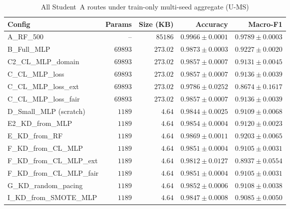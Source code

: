 \documentclass[journal]{IEEEtran}
\newcommand{\ums}{U-MS}
\begin{document}
\begin{table}[!t]
\caption{All Student~A routes under train-only multi-seed aggregate (\ums{})}
\label{tab:all-A}
\centering
\scriptsize
\begin{tabular}{lrrrr}
\toprule
Config & Params & Size (KB) & Accuracy & Macro-F1 \\
\midrule
A\_RF\_500 & -- & $85186$ & $0.9966 \pm 0.0001$ & $0.9789 \pm 0.0003$ \\
B\_Full\_MLP & $69893$ & $273.02$ & $0.9873 \pm 0.0003$ & $0.9227 \pm 0.0020$ \\
C2\_CL\_MLP\_domain & $69893$ & $273.02$ & $0.9857 \pm 0.0007$ & $0.9131 \pm 0.0045$ \\
C\_CL\_MLP\_loss & $69893$ & $273.02$ & $0.9857 \pm 0.0007$ & $0.9136 \pm 0.0039$ \\
C\_CL\_MLP\_loss\_ext & $69893$ & $273.02$ & $0.9786 \pm 0.0252$ & $0.8674 \pm 0.1617$ \\
C\_CL\_MLP\_loss\_fair & $69893$ & $273.02$ & $0.9857 \pm 0.0007$ & $0.9136 \pm 0.0039$ \\
D\_Small\_MLP (scratch) & $1189$ & $4.64$ & $0.9844 \pm 0.0025$ & $0.9109 \pm 0.0068$ \\
E2\_KD\_from\_MLP & $1189$ & $4.64$ & $0.9854 \pm 0.0004$ & $0.9120 \pm 0.0023$ \\
E\_KD\_from\_RF & $1189$ & $4.64$ & $0.9869 \pm 0.0011$ & $0.9203 \pm 0.0065$ \\
F\_KD\_from\_CL\_MLP & $1189$ & $4.64$ & $0.9851 \pm 0.0004$ & $0.9105 \pm 0.0031$ \\
F\_KD\_from\_CL\_MLP\_ext & $1189$ & $4.64$ & $0.9812 \pm 0.0127$ & $0.8937 \pm 0.0554$ \\
F\_KD\_from\_CL\_MLP\_fair & $1189$ & $4.64$ & $0.9851 \pm 0.0004$ & $0.9105 \pm 0.0031$ \\
G\_KD\_random\_pacing & $1189$ & $4.64$ & $0.9852 \pm 0.0006$ & $0.9108 \pm 0.0038$ \\
I\_KD\_from\_SMOTE\_MLP & $1189$ & $4.64$ & $0.9847 \pm 0.0008$ & $0.9085 \pm 0.0050$ \\
\bottomrule
\end{tabular}
\end{table}
\end{document}
